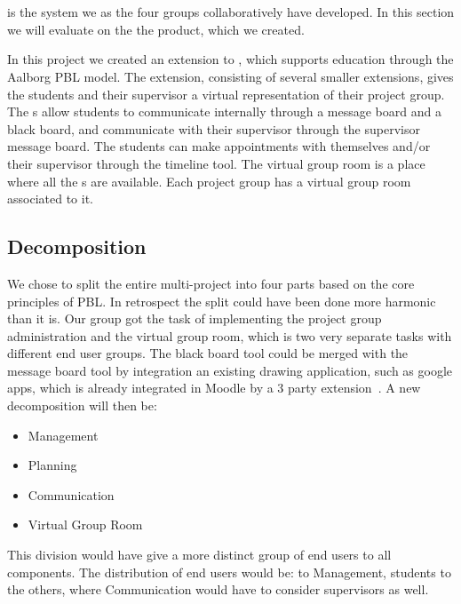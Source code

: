 \section{\system{}}
\label{sec:productsystem}
\system{} is the system we as the four groups collaboratively have developed.
In this section we will evaluate on the the product, which we created.


In this project we created an extension to \moodle{}, which supports education through the Aalborg PBL model. 
The extension, consisting of several smaller extensions, gives the students and their supervisor a virtual representation of their project group. 
The \detdeandrelaver{}s allow students to communicate internally through a message board and a black board, and communicate with their supervisor through the supervisor message board.
The students can make appointments with themselves and/or their supervisor through the timeline tool.
The virtual group room is a place where all the \detdeandrelaver{}s are available.
Each project group has a virtual group room associated to it.


\subsection{Decomposition}
We chose to split the entire multi-project into four parts based on the core principles of PBL. 
In retrospect the split could have been done more harmonic than it is.
Our group got the task of implementing the project group administration and the virtual group room, which is two very separate tasks with different end user groups. 
The black board tool could be merged with the message board tool by integration an existing drawing application, such as google apps, which is already integrated in Moodle by a 3\rd{} party extension~\cite{moodlegoogleapp}. 
A new decomposition will then be:
\begin{itemize}
	\item Management
	\item Planning
	\item Communication
	\item Virtual Group Room
\end{itemize}

This division would have give a more distinct group of end users to all components.
The distribution of end users would be:
\admpers{} to Management, students to the others, where Communication would have to consider supervisors as well.



